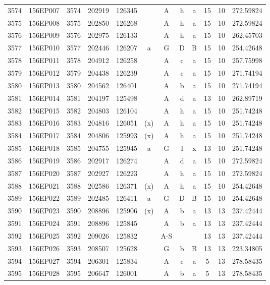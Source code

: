\begin{tabular}{|*{12}{c|}}
3574 & 156EP007 & 3574 & 202919 & 126345 &  & A & h & a & 15 & 10 & 272.59824 \\ 
3575 & 156EP008 & 3575 & 202850 & 126268 &  & A & h & a & 15 & 10 & 272.59824 \\ 
3576 & 156EP009 & 3576 & 202975 & 126133 &  & A & h & a & 15 & 10 & 262.45703 \\ 
3577 & 156EP010 & 3577 & 202446 & 126207 & a & G & D & B & 15 & 10 & 254.42648 \\ 
3578 & 156EP011 & 3578 & 204912 & 126258 &  & A & c & a & 15 & 10 & 257.75998 \\ 
3579 & 156EP012 & 3579 & 204438 & 126239 &  & A & c & a & 15 & 10 & 271.74194 \\ 
3580 & 156EP013 & 3580 & 204562 & 126401 &  & A & b & a & 15 & 10 & 271.74194 \\ 
3581 & 156EP014 & 3581 & 204197 & 125498 &  & A & d & a & 13 & 10 & 262.89719 \\ 
3582 & 156EP015 & 3582 & 204803 & 126104 &  & A & h & a & 15 & 10 & 251.74248 \\ 
3583 & 156EP016 & 3583 & 204816 & 126051 & (x) & A & h & a & 15 & 10 & 251.74248 \\ 
3584 & 156EP017 & 3584 & 204806 & 125993 & (x) & A & h & a & 15 & 10 & 251.74248 \\ 
3585 & 156EP018 & 3585 & 204755 & 125945 & a & G & I & x & 13 & 10 & 251.74248 \\ 
3586 & 156EP019 & 3586 & 202917 & 126274 &  & A & d & a & 15 & 10 & 272.59824 \\ 
3587 & 156EP020 & 3587 & 202927 & 126223 &  & A & h & a & 15 & 10 & 272.59824 \\ 
3588 & 156EP021 & 3588 & 202586 & 126371 & (x) & A & h & a & 15 & 10 & 254.42648 \\ 
3589 & 156EP022 & 3589 & 202485 & 126411 & a & G & D & B & 15 & 10 & 254.42648 \\ 
3590 & 156EP023 & 3590 & 208896 & 125906 & (x) & A & b & a & 13 & 13 & 237.42444 \\ 
3591 & 156EP024 & 3591 & 208896 & 125845 &  & A & b & a & 13 & 13 & 237.42444 \\ 
3592 & 156EP025 & 3592 & 209026 & 125832 &  & A-S &  &  & 13 & 13 & 237.42444 \\ 
3593 & 156EP026 & 3593 & 208507 & 125628 &  & G & b & B & 13 & 13 & 223.34805 \\ 
3594 & 156EP027 & 3594 & 206301 & 125834 &  & A & c & a & 5 & 13 & 278.58435 \\ 
3595 & 156EP028 & 3595 & 206647 & 126001 &  & A & b & a & 5 & 13 & 278.58435 \\ 

\end{tabular}
